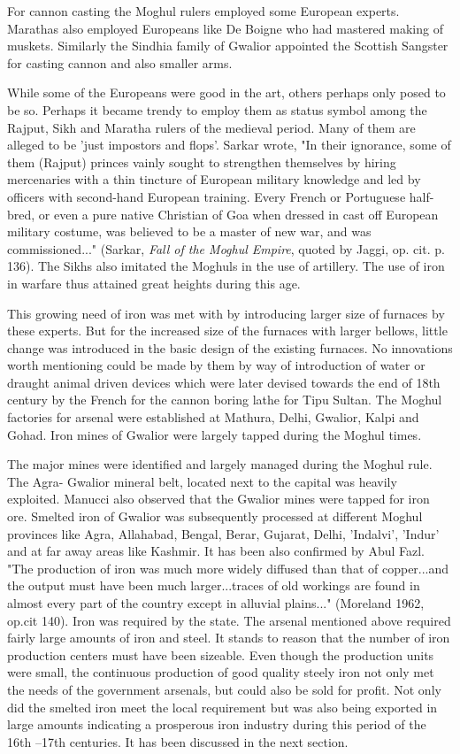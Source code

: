 For cannon casting the Moghul rulers employed some European experts. Marathas also employed Europeans like De Boigne who had mastered making of muskets. Similarly the Sindhia family of Gwalior appointed the Scottish Sangster for casting cannon and also smaller arms.

While some of the Europeans were good in the art, others perhaps only posed to be so. Perhaps it became trendy to employ them as status symbol among the Rajput, Sikh and Maratha rulers of the medieval period. Many of them are alleged to be 'just impostors and flops'. Sarkar wrote, "In their ignorance, some of them (Rajput) princes vainly sought to strengthen themselves by hiring mercenaries with a thin tincture of European military knowledge and led by officers with second-hand European training. Every French or Portuguese half-bred, or even a pure native Christian of Goa when dressed in cast off European military costume, was believed to be a master of new war, and was commissioned..." (Sarkar, \textit{Fall of the Moghul Empire}, quoted by Jaggi, op. cit. p. 136). The Sikhs also imitated the Moghuls in the use of artillery. The use of iron in warfare thus attained great heights during this age.

This growing need of iron was met with by introducing larger size of furnaces by these experts. But for the increased size of the furnaces with larger bellows, little change was introduced in the basic design of the existing furnaces. No innovations worth mentioning could be made by them by way of introduction of water or draught animal driven devices which were later devised towards the end of 18th century by the French for the cannon boring lathe for Tipu Sultan. The Moghul factories for arsenal were established at Mathura, Delhi, Gwalior, Kalpi and Gohad. Iron mines of Gwalior were largely tapped during the Moghul times.

The major mines were identified and largely managed during the Moghul rule. The Agra- Gwalior mineral belt, located next to the capital was heavily exploited. Manucci also observed that the Gwalior mines were tapped for iron ore. Smelted iron of Gwalior was subsequently processed at different Moghul provinces like Agra, Allahabad, Bengal, Berar, Gujarat, Delhi, 'Indalvi', 'Indur' and at far away areas like Kashmir. It has been also confirmed by Abul Fazl. "The production of iron was much more widely diffused than that of copper...and the output must have been much larger...traces of old workings are found in almost every part of the country except in alluvial plains..." (Moreland 1962, op.cit 140). Iron was required by the state. The arsenal mentioned above required fairly large amounts of iron and steel. It stands to reason that the number of iron production centers must have been sizeable. Even though the production units were small, the continuous production of good quality steely iron not only met the needs of the government arsenals, but could also be sold for profit. Not only did the smelted iron meet the local requirement but was also being exported in large amounts indicating a prosperous iron industry during this period of the 16th –17th centuries. It has been discussed in the next section.

